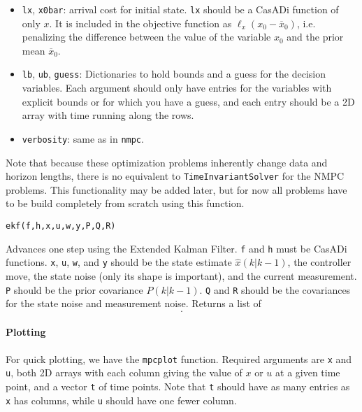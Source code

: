 \documentclass{article}
\newcommand{\funcname}[1]{\vspace{.25em}\noindent\texttt{#1}\vspace{.25em}}
\newcommand{\casadi}{CasADi}
\begin{document}
\begin{multicols}{2}
\begin{itemize}[noitemsep,nolistsep]
    \item \texttt{lx}, \texttt{x0bar}: arrival cost for initial state.
    \texttt{lx} should be a \casadi{} function of only $x$.
    It is included in the objective function as $\ell_x(x_0 - \overline{x}_0)$, i.e. penalizing the difference between the value of the variable $x_0$ and the prior mean $\overline{x}_0$.
    \item \texttt{lb}, \texttt{ub}, \texttt{guess}: Dictionaries to hold bounds and a guess for the decision variables.
    Each argument should only have entries for the variables with explicit bounds or for which you have a guess, and each entry should be a 2D array with time running along the rows.
    \item \texttt{verbosity}: same as in \texttt{nmpc}.
\end{itemize}

Note that because these optimization problems inherently change data and horizon lengths, there is no equivalent to \texttt{TimeInvariantSolver} for the NMPC problems.
This functionality may be added later, but for now all problems have to be build completely from scratch using this function.

\funcname{ekf(f,h,x,u,w,y,P,Q,R)}

Advances one step using the Extended Kalman Filter.
\texttt{f} and \texttt{h} must be \casadi{} functions.
\texttt{x}, \texttt{u}, \texttt{w}, and \texttt{y} should be the state estimate $\hat{x}(k|k-1)$, the controller move, the state noise (only its shape is important), and the current measurement.
\texttt{P} should be the prior covariance $P(k|k-1)$.
\texttt{Q} and \texttt{R} should be the covariances for the state noise and measurement noise.
Returns a list of
%
\begin{equation*}
    [P(k+1|k), \hat{x}(k+1|k), P(k|k), \hat{x}(k|k)].
\end{equation*}

\paragraph{Plotting}

For quick plotting, we have the \texttt{mpcplot} function.
Required arguments are \texttt{x} and \texttt{u}, both 2D arrays with each column giving the value of $x$ or $u$ at a given time point, and a vector \texttt{t} of time points.
Note that \texttt{t} should have as many entries as \texttt{x} has columns, while \texttt{u} should have one fewer column.


\end{multicols}
\end{document}
